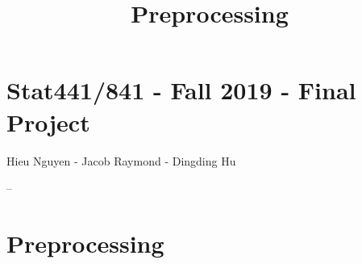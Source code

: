 \documentclass[11pt]{article}
\title{Preprocessing}
\begin{document}
    
    
    \maketitle
    
    

    
    \hypertarget{stat441841---fall-2019---final-project}{%
\section{Stat441/841 - Fall 2019 - Final
Project}\label{stat441841---fall-2019---final-project}}

Hieu Nguyen - Jacob Raymond - Dingding Hu

--

    \hypertarget{preprocessing}{%
\section{Preprocessing}\label{preprocessing}}
\end{document}
